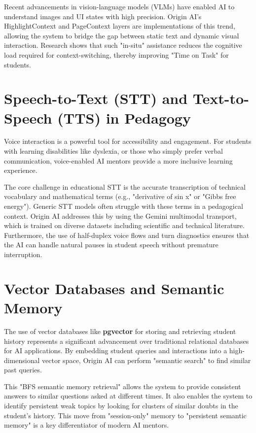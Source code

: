 Recent advancements in vision-language models (VLMs) have enabled AI to understand images and UI states with high precision. Origin AI's HighlightContext and PageContext layers are implementations of this trend, allowing the system to bridge the gap between static text and dynamic visual interaction. Research shows that such "in-situ" assistance reduces the cognitive load required for context-switching, thereby improving "Time on Task" for students.

\section{Speech-to-Text (STT) and Text-to-Speech (TTS) in Pedagogy}

Voice interaction is a powerful tool for accessibility and engagement. For students with learning disabilities like dyslexia, or those who simply prefer verbal communication, voice-enabled AI mentors provide a more inclusive learning experience.

The core challenge in educational STT is the accurate transcription of technical vocabulary and mathematical terms (e.g., "derivative of sin x" or "Gibbs free energy"). Generic STT models often struggle with these terms in a pedagogical context. Origin AI addresses this by using the Gemini multimodal transport, which is trained on diverse datasets including scientific and technical literature. Furthermore, the use of half-duplex voice flows and turn diagnostics ensures that the AI can handle natural pauses in student speech without premature interruption.

\section{Vector Databases and Semantic Memory}

The use of vector databases like \textbf{pgvector} for storing and retrieving student history represents a significant advancement over traditional relational databases for AI applications. By embedding student queries and interactions into a high-dimensional vector space, Origin AI can perform "semantic search" to find similar past queries.

This "BFS semantic memory retrieval" allows the system to provide consistent answers to similar questions asked at different times. It also enables the system to identify persistent weak topics by looking for clusters of similar doubts in the student's history. This move from "session-only" memory to "persistent semantic memory" is a key differentiator of modern AI mentors.


